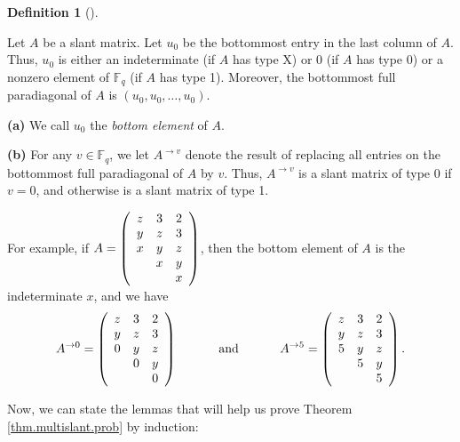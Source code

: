 \documentclass[numbers=enddot,12pt,final,onecolumn,notitlepage]{scrartcl}%
\theoremstyle{definition}
\newtheorem{defi}[theo]{Definition}
\newenvironment{definition}[1][]
{\begin{defi}[#1]\begin{leftbar}}
{\end{leftbar}\end{defi}}
\newcommand{\Fq}{\mathbb{F}_q}
\theoremstyle{plainsl}
\begin{document}
\begin{definition}
Let $A$ be a slant matrix. Let $u_{0}$ be the bottommost entry in the last
column of $A$. Thus, $u_{0}$ is either an indeterminate (if $A$ has type X) or
$0$ (if $A$ has type 0) or a nonzero element of $\Fq$ (if $A$ has type 1).
Moreover, the bottommost full paradiagonal of $A$ is $\left(  u_{0}%
,u_{0},\ldots,u_{0}\right)  $.

\textbf{(a)} We call $u_{0}$ the \emph{bottom element} of $A$.

\textbf{(b)} For any $v\in \Fq$, we let $A^{\rightarrow v}$ denote the result of
replacing all entries on the bottommost full paradiagonal of $A$ by $v$. Thus,
$A^{\rightarrow v}$ is a slant matrix of type 0 if $v=0$, and otherwise is a
slant matrix of type 1.
\end{definition}

For example, if $A=\left(
\begin{array}
[c]{ccc}%
z & 3 & 2\\
y & z & 3\\
x & y & z\\
& x & y\\
&  & x
\end{array}
\right)  $, then the bottom element of $A$ is the indeterminate $x$, and we
have%
\[
A^{\rightarrow0}=\left(
\begin{array}
[c]{ccc}%
z & 3 & 2\\
y & z & 3\\
0 & y & z\\
& 0 & y\\
&  & 0
\end{array}
\right)  \ \ \ \ \ \ \ \ \ \ \text{and}\ \ \ \ \ \ \ \ \ \ A^{\rightarrow
5}=\left(
\begin{array}
[c]{ccc}%
z & 3 & 2\\
y & z & 3\\
5 & y & z\\
& 5 & y\\
&  & 5
\end{array}
\right)  .
\]


Now, we can state the lemmas that will help us prove Theorem
\ref{thm.multislant.prob} by induction:
\end{document}
